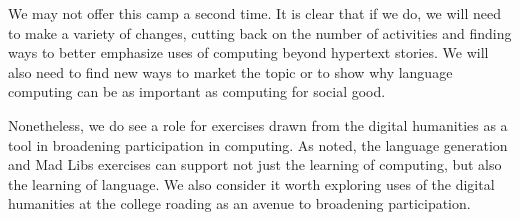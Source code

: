 We may not offer this camp a second time.  It is clear that if we
do, we will need to make a variety of changes, cutting back on the
number of activities and finding ways to better emphasize uses of
computing beyond hypertext stories.  We will also need to find new
ways to market the topic or to show why language computing can be
as important as computing for social good.

Nonetheless, we do see a role for exercises drawn from the digital
humanities as a tool in broadening participation in computing.  As
noted, the language generation and Mad Libs exercises can support
not just the learning of computing, but also the learning of language.
We also consider it worth exploring uses of the digital humanities
at the college roading as an avenue to broadening participation.


